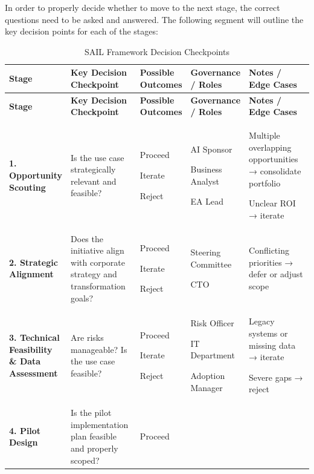 \documentclass[]{imc-inf}
\begin{document}
In order to properly decide whether to move to the next stage, the
correct questions need to be asked and answered. The following segment
will outline the key decision points for each of the stages:

\begin{longtable}{|p{0.17\linewidth}|p{0.27\linewidth}|p{0.10\linewidth}|p{0.16\linewidth}|p{0.30\linewidth}|}
	\hline
	\textbf{Stage} &
	\textbf{Key Decision Checkpoint} &
	\textbf{Possible Outcomes} &
	\textbf{Governance / Roles} &
	\textbf{Notes / Edge Cases} \\
	\hline
	\endfirsthead
	\hline
	\textbf{Stage} &
	\textbf{Key Decision Checkpoint} &
	\textbf{Possible Outcomes} &
	\textbf{Governance / Roles} &
	\textbf{Notes / Edge Cases} \\
	\hline
	\endhead
	\hline
	\caption{SAIL Framework Decision Checkpoints}
	\label{tab:decision_checkpoints}
	\endlastfoot
	
	\textbf{1. Opportunity Scouting} &
	Is the use case strategically relevant and feasible? &
	Proceed
	
	Iterate
	
	Reject &
	AI Sponsor
	
	Business Analyst
	
	EA Lead &
	Multiple overlapping opportunities → consolidate portfolio
	
	Unclear ROI → iterate \\
	\hline
	
	\textbf{2. Strategic Alignment} &
	Does the initiative align with corporate strategy and transformation goals? &
	Proceed
	
	Iterate
	
	Reject &
	Steering Committee
	
	CTO &
	Conflicting priorities → defer or adjust scope \\
	\midrule
	
	\textbf{3. Technical Feasibility \& Data Assessment} &
	Are risks manageable? Is the use case feasible? &
	Proceed
	
	Iterate
	
	Reject &
	Risk Officer
	
	IT Department
	
	Adoption Manager &
	Legacy systems or missing data → iterate
	
	Severe gaps → reject \\
	\midrule
	
	\textbf{4. Pilot Design} &
	Is the pilot implementation plan feasible and properly scoped? &
	Proceed
	

\end{longtable}
\end{document}
